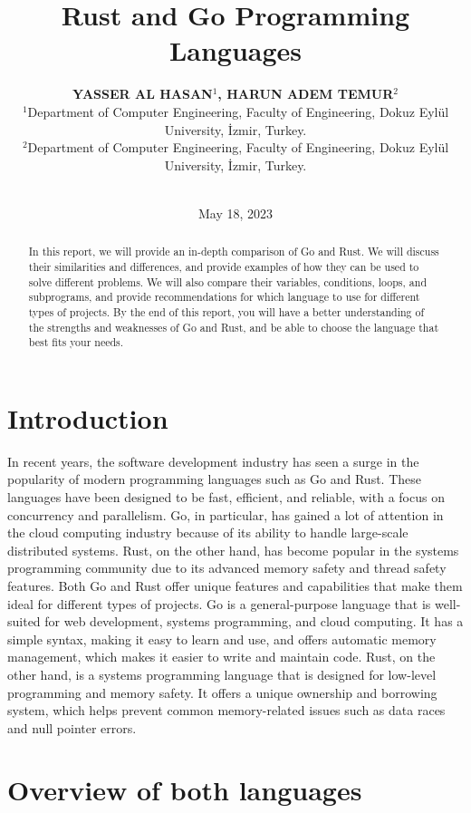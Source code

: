 \documentclass{dclass}
\title{Rust and Go Programming Languages}
\author[YASSER AL HASAN and HARUN ADEM TEMUR]{
\textbf{YASSER AL HASAN$^{1}$, HARUN ADEM TEMUR$^{2}$}\\
$^{1}$Department of Computer Engineering, Faculty of Engineering, Dokuz Eylül University, İzmir, Turkey. \\
$^{2}$Department of Computer Engineering, Faculty of Engineering, Dokuz Eylül University, İzmir, Turkey. \\
\\ [1.8em]

\date{May 18, 2023}

}
\begin{document}
\maketitle


\begin{abstract}In this report, we will provide an in-depth comparison of Go and Rust. We will discuss their similarities and differences, and provide examples of how they can be used to solve different problems. We will also compare their variables, conditions, loops, and subprograms, and provide recommendations for which language to use for different types of projects. By the end of this report, you will have a better understanding of the strengths and weaknesses of Go and Rust, and be able to choose the language that best fits your needs.

\end{abstract}

\section{Introduction}
\label{Int}

In recent years, the software development industry has seen a surge in the popularity of modern programming languages such as Go and Rust. These languages have been designed to be fast, efficient, and reliable, with a focus on concurrency and parallelism. Go, in particular, has gained a lot of attention in the cloud computing industry because of its ability to handle large-scale distributed systems. Rust, on the other hand, has become popular in the systems programming community due to its advanced memory safety and thread safety features.
Both Go and Rust offer unique features and capabilities that make them ideal for different types of projects. Go is a general-purpose language that is well-suited for web development, systems programming, and cloud computing. It has a simple syntax, making it easy to learn and use, and offers automatic memory management, which makes it easier to write and maintain code. \cite{ref1}Rust, on the other hand, is a systems programming language that is designed for low-level programming and memory safety. It offers a unique ownership and borrowing system, which helps prevent common memory-related issues such as data races and null pointer errors.

\section{Overview of both languages}
\end{document}
